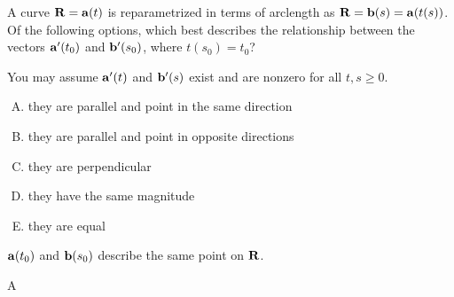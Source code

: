 \begin{question}
A curve $\mathbf{R}=\mathbf{a}(t)$ is reparametrized in terms of arclength as $\mathbf{R}=\mathbf{b}(s)=\mathbf{a}(t(s))$. Of the following options, which best describes the relationship between the vectors $\mathbf{a}'(t_0)$ and $\mathbf{b}'(s_0)$, where $t(s_0)=t_0$?

You may assume $\mathbf{a}'(t)$  and $\mathbf{b}'(s)$ exist and are nonzero for all $t,s\ge0$.
\begin{enumerate}[A.]
\item they are parallel and point in the same direction
\item they are parallel and point in opposite directions
\item they are perpendicular
\item they have the same magnitude
\item they are equal
\end{enumerate}
\end{question}
\begin{hint}
$\mathbf{a}(t_0)$ and $\mathbf{b}(s_0)$ describe the same point on $\mathbf{R}$.
\end{hint}
\begin{answer}
A
\end{answer}

